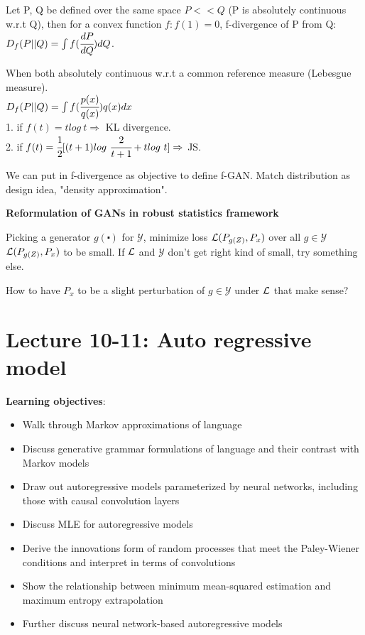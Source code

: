 \documentclass[12pt,a4paper]{article}
\begin{document}
Let P, Q be defined over the same space $P<<Q$ (P is absolutely continuous w.r.t Q), then for a convex function $f: f(1)=0$, f-divergence of P from Q:\\
$D_f(P||Q)=\int f(\cfrac{dP}{dQ})dQ$. 

When both absolutely continuous w.r.t a common reference measure (Lebesgue measure).\\
$D_f(P||Q)=\int f(\cfrac{p(x)}{q(x)})q(x)dx$ \\
1. if $f(t)=tlog\ t\Rightarrow$ KL divergence.\\
2. if $f(t)=\cfrac{1}{2} [(t+1)log\ \cfrac{2}{t+1}+tlog\ t]\Rightarrow$ JS. 

We can put in f-divergence as objective to define f-GAN. Match distribution as design idea, "density approximation".

\vspace{0.5cm}
\textbf{Reformulation of GANs in robust statistics framework}

Picking a generator $g(\centerdot)$ for $\mathcal{Y}$, minimize loss $\mathcal{L}(P_{g(Z)}, P_x)$ over all $g\in \mathcal{Y}$\\
$\mathcal{L}(P_{g(Z)},P_x)$ to be small. If $\mathcal{L}$ and $\mathcal{Y}$ don't get right kind of small, try something else. 

How to have $P_x$ to be a slight perturbation of $g\in \mathcal{Y}$ under $\mathcal{L}$ that make sense?

\section{Lecture 10-11: Auto regressive model}
\textbf{Learning objectives}:

\begin{itemize}
\item Walk through Markov approximations of language
\item Discuss generative grammar formulations of language and their contrast with Markov models
\item Draw out autoregressive models parameterized by neural networks, including those with causal convolution layers
\item Discuss MLE for autoregressive models
\item Derive the innovations form of random processes that meet the Paley-Wiener conditions and interpret in terms of convolutions
\item Show the relationship between minimum mean-squared estimation and maximum entropy extrapolation
\item Further discuss neural network-based autoregressive models
\end{itemize}
\end{document}
